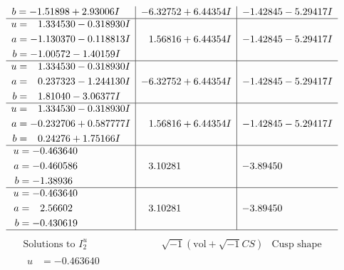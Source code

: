 \documentclass[1p]{elsarticle_modified}
\theoremstyle{definition}
\newcommand{\I}{\sqrt{-1}}
\begin{document}
$$\begin{array}{c|c|c}
\begin{aligned}
b &= -1.51898 + 2.93006 I\end{aligned}
 & -6.32752 + 6.44354 I & -1.42845 - 5.29417 I \\ \hline\begin{aligned}
u &= \phantom{-}1.334530 - 0.318930 I \\
a &= -1.130370 - 0.118813 I \\
b &= -1.00572 - 1.40159 I\end{aligned}
 & \phantom{-}1.56816 + 6.44354 I & -1.42845 - 5.29417 I \\ \hline\begin{aligned}
u &= \phantom{-}1.334530 - 0.318930 I \\
a &= \phantom{-}0.237323 - 1.244130 I \\
b &= \phantom{-}1.81040 - 3.06377 I\end{aligned}
 & -6.32752 + 6.44354 I & -1.42845 - 5.29417 I \\ \hline\begin{aligned}
u &= \phantom{-}1.334530 - 0.318930 I \\
a &= -0.232706 + 0.587777 I \\
b &= \phantom{-}0.24276 + 1.75166 I\end{aligned}
 & \phantom{-}1.56816 + 6.44354 I & -1.42845 - 5.29417 I \\ \hline\begin{aligned}
u &= -0.463640\phantom{ +0.000000I} \\
a &= -0.460586\phantom{ +0.000000I} \\
b &= -1.38936\phantom{ +0.000000I}\end{aligned}
 & \phantom{-}3.10281\phantom{ +0.000000I} & -3.89450\phantom{ +0.000000I} \\ \hline\begin{aligned}
u &= -0.463640\phantom{ +0.000000I} \\
a &= \phantom{-}2.56602\phantom{ +0.000000I} \\
b &= -0.430619\phantom{ +0.000000I}\end{aligned}
 & \phantom{-}3.10281\phantom{ +0.000000I} & -3.89450\phantom{ +0.000000I}\\
 \hline 
 \end{array}$$\newpage$$\begin{array}{c|c|c}  
\text{Solutions to }I^u_{2}& \I (\text{vol} + \sqrt{-1}CS) & \text{Cusp shape}\\
 \hline 
\begin{aligned}
u &= -0.463640\phantom{ +0.000000I} \\

\end{aligned}
\end{array}$$
\end{document}
